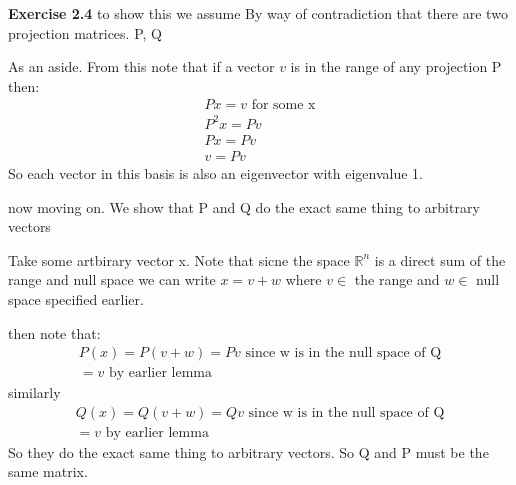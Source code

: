 \documentclass[12pt]{article}
\newenvironment{exercise}[1]{\vspace{.1in}\noindent\textbf{Exercise #1 \hspace{.05em}}}{}
\newcommand{\R}{\mathbb{R}}
\begin{document}
\begin{exercise}{2.4}
	to show this we assume By way of contradiction that there are two projection matrices. P, Q

	As an aside. From this note that if a vector $v$ is in the range of any projection P then:
	\begin{align}
		Px=v \text{ for some x} \\
		P^2x=Pv                 \\
		Px=Pv                   \\
		v=Pv
	\end{align}
	So each vector in this basis is also an eigenvector with eigenvalue 1.

	now moving on. We show that P and Q do the exact same thing to arbitrary vectors

	Take some artbirary vector x. Note that sicne the space $\R^n$ is a direct sum of the range and null space we can write $x=v+w$ where $v\in$ the range and $w\in$ null space specified earlier.

	then note that:
	\begin{align}
		P(x)=P(v+w)=Pv \text{ since w is in the null space of Q} \\
		=v \text{ by earlier lemma}
	\end{align}
	similarly
	\begin{align}
		Q(x)=Q(v+w)=Qv \text{ since w is in the null space of Q} \\
		=v \text{ by earlier lemma}
	\end{align}
	So they do the exact same thing to arbitrary vectors. So Q and P must be the same matrix.

\end{exercise}
\end{document}
